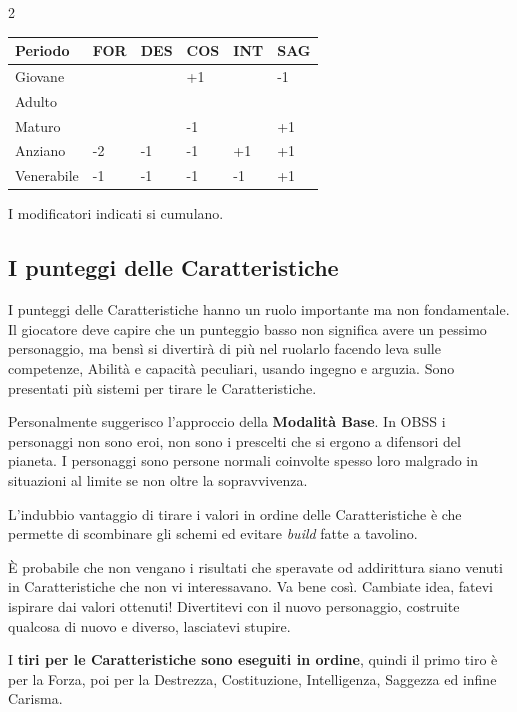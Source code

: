\begin{multicols}{2}
\medskip

\noindent\begin{tabularx}{\linewidth}{llllll}
	\toprule
\rowcolor{gray!20}\textbf{Periodo} & \textbf{FOR} & \textbf{DES} & \textbf{COS} & \textbf{INT} & \textbf{SAG}\\
\toprule
Giovane& & & +1 & & -1 \\
\rowcolor{gray!20}Adulto& & &  & & \\
Maturo& & & -1 & & +1 \\
\rowcolor{gray!20}Anziano& -2 & -1 & -1 & +1 & +1 \\
Venerabile&-1 & -1 & -1 & -1 & +1 \\
\end{tabularx}

\medskip

I modificatori indicati si cumulano.

\subsection{I punteggi delle Caratteristiche} \hypertarget{assegnazione.punteggi.caratteristica}{}\label{assegnazionepunteggicaratteristica}\hypertarget{assegnazionepunteggicaratteristica}{}

I punteggi delle Caratteristiche hanno un ruolo importante ma non fondamentale. Il giocatore deve capire che un punteggio basso non significa avere un pessimo personaggio, ma bensì si divertirà di più nel ruolarlo facendo leva sulle competenze, Abilità e capacità peculiari, usando ingegno e arguzia. Sono presentati più sistemi per tirare le Caratteristiche.

Personalmente suggerisco l'approccio della \textbf{Modalità Base}. In OBSS i personaggi non sono eroi, non sono i prescelti che si ergono a difensori del pianeta. I personaggi sono persone normali coinvolte spesso loro malgrado in situazioni al limite se non oltre la sopravvivenza.

L'indubbio vantaggio di tirare i valori in ordine delle Caratteristiche è che permette di scombinare gli schemi ed evitare \emph{build} fatte a tavolino.

È probabile che non vengano i risultati che speravate od addirittura siano venuti in Caratteristiche che non vi interessavano. Va bene così. Cambiate idea, fatevi ispirare dai valori ottenuti! Divertitevi con il nuovo personaggio, costruite qualcosa di nuovo e diverso, lasciatevi stupire.

I \textbf{tiri per le Caratteristiche sono eseguiti in ordine}, quindi il primo tiro è per la Forza, poi per la Destrezza, Costituzione, Intelligenza, Saggezza ed infine Carisma.


\end{multicols}
